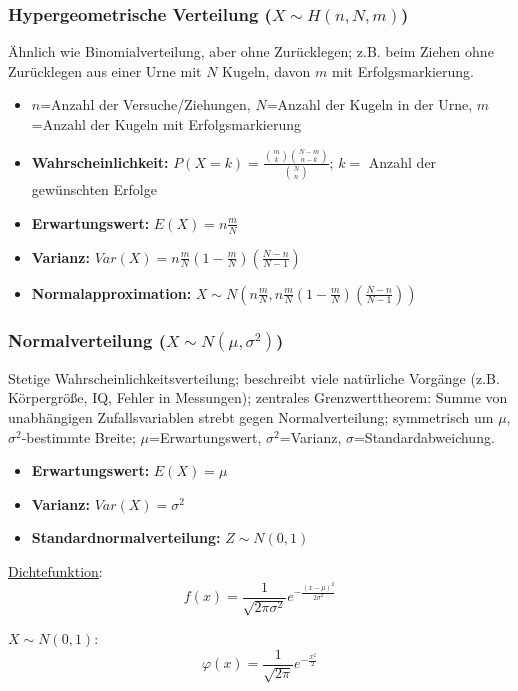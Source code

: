 \subsubsection{Hypergeometrische Verteilung (\(X\sim H(n,N,m)\))}

Ähnlich wie Binomialverteilung, aber ohne Zurücklegen; z.B. beim Ziehen ohne Zurücklegen aus einer Urne mit \(N\) Kugeln, davon \(m\) mit Erfolgsmarkierung.

\begin{itemize}
    \item \(n\)=Anzahl der Versuche/Ziehungen, \(N\)=Anzahl der Kugeln in der Urne, \(m\)=Anzahl der Kugeln mit Erfolgsmarkierung
    \item \textbf{Wahrscheinlichkeit:} \(P(X=k)=\frac{\binom{m}{k}\binom{N-m}{n-k}}{\binom{N}{n}}\); \(k=\) Anzahl der gewünschten Erfolge
    \item \textbf{Erwartungswert:} \(E(X)=n\frac{m}{N}\)
    \item \textbf{Varianz:} \(Var(X)=n\frac{m}{N}\left(1-\frac{m}{N}\right)\left(\frac{N-n}{N-1}\right)\)
    \item \textbf{Normalapproximation:} \(X\sim N\left(n\frac{m}{N}, n\frac{m}{N}\left(1-\frac{m}{N}\right)\left(\frac{N-n}{N-1}\right)\right)\)
\end{itemize}


\subsubsection{Normalverteilung (\(X\sim N(\mu, \sigma^2)\))}
Stetige Wahrscheinlichkeitsverteilung; beschreibt viele natürliche Vorgänge (z.B. Körpergröße, IQ, Fehler in Messungen); zentrales Grenzwerttheorem: Summe von unabhängigen Zufallsvariablen strebt gegen Normalverteilung; symmetrisch um \(\mu\), \(\sigma^2\)-bestimmte Breite; \(\mu\)=Erwartungswert, \(\sigma^2\)=Varianz, \(\sigma\)=Standardabweichung.\\

\begin{minipage}{0.5\textwidth}
    \begin{itemize}
        \item \textbf{Erwartungswert:} \(E(X)=\mu\)
        \item \textbf{Varianz:} \(Var(X)=\sigma^2\)
        \item \textbf{Standardnormalverteilung:} \(Z\sim N(0,1)\)
    \end{itemize}
\end{minipage}
\begin{minipage}{0.2\textwidth}
    \underline{Dichtefunktion}:
    \begin{equation*}
        f(x)=\frac{1}{\sqrt{2\pi\sigma^2}}e^{-\frac{(x-\mu)^2}{2\sigma^2}}
    \end{equation*}
\end{minipage}
\hspace{1cm}
\begin{minipage}{0.2\textwidth}
    \underline{\(X\sim N(0, 1)\)}:
    \begin{equation*}
        \varphi(x)=\frac{1}{\sqrt{2\pi}}e^{-\frac{x^2}{2}}
    \end{equation*}
\end{minipage}